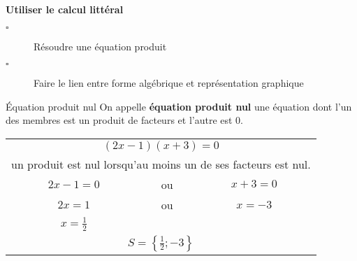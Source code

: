 \begin{titre}

\end{titre}


\begin{CpsCol}
\textbf{Utiliser le calcul littéral}
\begin{description}
\item[$\square$] Résoudre une équation produit
\item[$\square$] Faire le lien entre forme algébrique et représentation graphique
\end{description}
\end{CpsCol}


\begin{DefT}{Équation produit nul}
On appelle \textbf{équation produit nul} une équation dont l'un des membres est un produit de facteurs et l'autre est 0. 
\end{DefT}


\begin{Mt}

\begin{tabular}{ccc}
\multicolumn{3}{c}{$(2x-1)(x+3)=0$} \\ 
\multicolumn{3}{c}{un produit est nul lorsqu'au moins un de ses facteurs est nul. }\\  
$2x-1=0$ & ou & $x+3=0$ \\  
$2x=1$ & ou & $x=-3$ \\ 
$x=\frac{1}{2}$ &  &  \\ 
\multicolumn{3}{c}{$S=\left\lbrace \frac{1}{2}; -3 \right\rbrace $}\\  
\end{tabular} 
\end{Mt}



